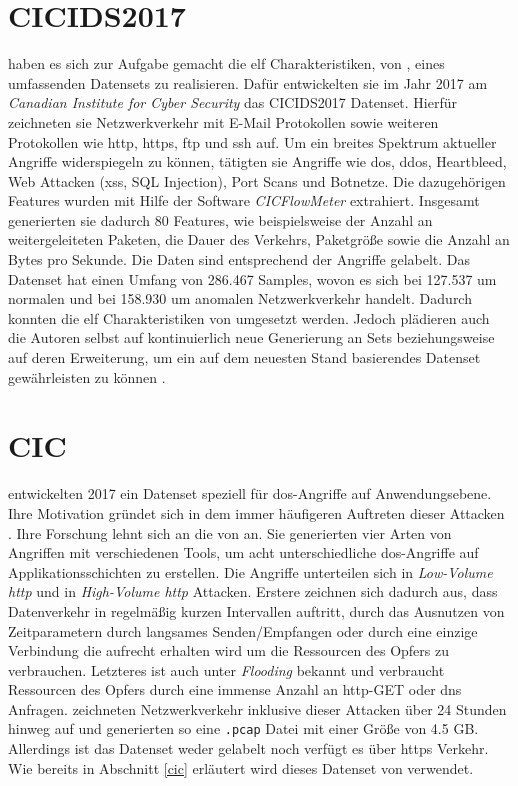\documentclass[
    12pt, %
    DIV10,
    ngerman, %
    a4paper, %
    oneside, %
    titlepage, %
    parskip=half, %
    headings=normal, %
    listof=totoc, %
    bibliography=totoc, %
    index=totoc, %
    captions=tableheading, %
    final %
]{scrreprt}
\begin{document}
\section{CICIDS2017}
\textcite{Sharafaldin2018} haben es sich zur Aufgabe gemacht die elf Charakteristiken, von \citeauthor{7885840}, eines umfassenden Datensets  zu realisieren. Dafür entwickelten sie im Jahr 2017 am \emph{Canadian Institute for Cyber Security} das CICIDS2017 Datenset. Hierfür zeichneten sie Netzwerkverkehr mit E-Mail Protokollen sowie weiteren Protokollen wie \ac{http}, \ac{https}, \ac{ftp} und \ac{ssh} auf. Um ein breites Spektrum aktueller Angriffe widerspiegeln zu können, tätigten sie Angriffe wie \ac{dos}, \ac{ddos}, Heartbleed, Web Attacken (\ac{xss}, SQL Injection), Port Scans und Botnetze. Die dazugehörigen Features wurden mit Hilfe der Software \emph{CICFlowMeter} \parencite{Lashkari201} extrahiert. Insgesamt  generierten sie dadurch 80 Features, wie beispielsweise der Anzahl an weitergeleiteten Paketen, die Dauer des Verkehrs, Paketgröße sowie die Anzahl an Bytes pro Sekunde.
Die Daten sind entsprechend der Angriffe gelabelt. Das Datenset hat einen Umfang von 286.467 Samples, wovon es sich bei 127.537 um normalen und bei 158.930 um anomalen Netzwerkverkehr handelt. Dadurch konnten die elf Charakteristiken von \citeauthor{7885840} umgesetzt werden. Jedoch plädieren auch die Autoren selbst auf kontinuierlich neue Generierung an Sets beziehungsweise auf deren Erweiterung, um ein auf dem neuesten Stand basierendes Datenset gewährleisten zu können \parencite{Sharafaldin2018}.
\section{CIC}
\textcite{jazi2017detecting} entwickelten 2017 ein Datenset speziell für \ac{dos}-Angriffe auf Anwendungsebene. Ihre Motivation gründet sich in dem immer häufigeren Auftreten dieser Attacken \parencite{NETSCOUT}.
Ihre Forschung lehnt sich an die von \textcite{shiravi2012toward} an. Sie generierten vier Arten von Angriffen mit verschiedenen Tools, um acht unterschiedliche \ac{dos}-Angriffe auf Applikationsschichten zu erstellen. Die Angriffe unterteilen sich in \emph{Low-Volume \ac{http}} und in \emph{High-Volume \ac{http}} Attacken. Erstere zeichnen sich dadurch aus, dass Datenverkehr in regelmäßig kurzen Intervallen auftritt, durch das Ausnutzen von Zeitparametern durch langsames Senden/Empfangen oder durch eine einzige Verbindung die aufrecht erhalten wird um die Ressourcen des Opfers zu verbrauchen. Letzteres ist auch unter \emph{Flooding} bekannt und verbraucht Ressourcen des Opfers durch eine immense Anzahl an \ac{http}-GET oder \ac{dns} Anfragen. \citeauthor{jazi2017detecting} zeichneten Netzwerkverkehr inklusive dieser Attacken über 24 Stunden hinweg auf und generierten so eine \texttt{.pcap} Datei mit einer Größe von 4.5 GB. Allerdings ist das Datenset weder gelabelt noch verfügt es über \ac{https} Verkehr. Wie bereits in Abschnitt \ref{cic} erläutert wird dieses Datenset von \textcite{siracusano2018detection} verwendet.
\end{document}
